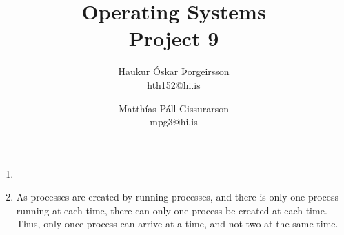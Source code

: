 \documentclass[a4]{article}
\title{Operating Systems\\
Project 9}
\author{
    Haukur Óskar Þorgeirsson\\
    hth152@hi.is \and
    Matthías Páll Gissurarson\\
    mpg3@hi.is
}
\begin{document}
\maketitle

\begin{enumerate}
\item {}

\item As processes are created by running processes, and there is only
  one process running at each time, there can only one process be
  created at each time. Thus, only once process can arrive at a time,
  and not two at the same time.
\end{enumerate}
\end{document}
